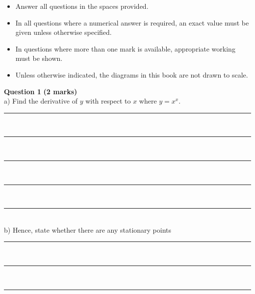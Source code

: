 \documentclass[a4paper,12pt]{article}
\begin{document}
\newpage

\begin{tcolorbox}[enhanced, width=0.95\linewidth, borderline={0.75pt}{-1.5pt}{black}, colframe=black, colback=white, colbacktitle=white, coltitle=black, fonttitle=\bfseries, adjusted title=center, halign title=center, boxrule=0.75pt, titlerule=0mm, toptitle=2.5mm, bottom=4mm, sharp corners=all, title={Instructions}]
    \begin{itemize}[leftmargin=*]  %
        \item Answer all questions in the spaces provided.
        \item In all questions where a numerical answer is required, an exact value must be given unless otherwise specified.
        \item In questions where more than one mark is available, appropriate working must be shown.
        \item Unless otherwise indicated, the diagrams in this book are not drawn to scale.
    \end{itemize}
\end{tcolorbox}


\noindent \textbf{Question 1} \hfill \textbf{(2 marks)} \\[0.3cm]
a) Find the derivative of \( y \) with respect to \( x \) where \( y = x^x \). \hfill {} \\[1cm]
\rule{\textwidth}{0.5pt} \\[0.7cm]
\rule{\textwidth}{0.5pt} \\[0.7cm]
\rule{\textwidth}{0.5pt} \\[0.7cm]
\rule{\textwidth}{0.5pt} \\[0.7cm]
\rule{\textwidth}{0.5pt} \\[2cm]
b) Hence, state whether there are any stationary points \hfill {} \\[1cm]
\rule{\textwidth}{0.5pt} \\[0.7cm]
\rule{\textwidth}{0.5pt} \\[0.7cm]
\rule{\textwidth}{0.5pt} \\[2cm]
\end{document}
